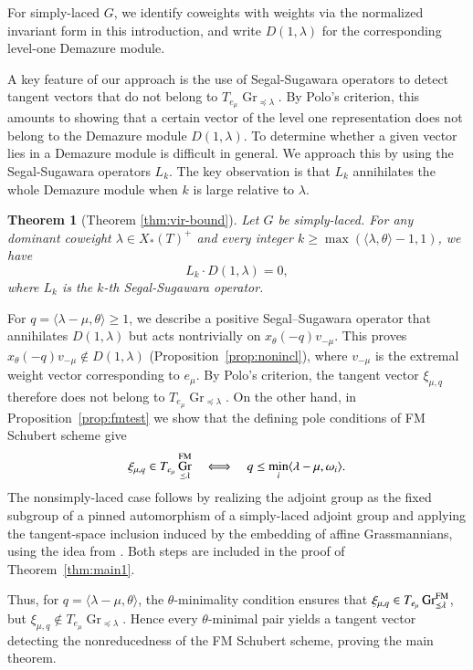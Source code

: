\documentclass[a4paper, 12pt]{amsart}
\newtheorem{introtheorem}[introconjecture]{Theorem}
\theoremstyle{definition}
\DeclareMathOperator{\Gr}{\mathrm{Gr}}
\begin{document}
For simply-laced $G$, we identify coweights with weights via the normalized
invariant form in this introduction, and write $D(1,\lambda)$ for the
corresponding level-one Demazure module.

A key feature of our approach is the use of Segal-Sugawara operators to detect tangent vectors that do not belong to $T_{e_\mu}\Gr_{\preceq \lambda}$.  By Polo's criterion, this amounts to
showing that a certain vector of the level one representation does not belong to the Demazure module $D(1,\lambda)$.  To determine whether a given vector lies in a Demazure module is difficult in
general. We approach this by using the Segal-Sugawara operators $L_k$. The key observation is that $L_k$ annihilates the whole Demazure module when $k$ is large relative to $\lambda$.
\begin{introtheorem}[Theorem \ref{thm:vir-bound}]
Let $G$ be simply-laced. For any dominant coweight $\lambda\in X_*(T)^+$ and  every integer  $k\geq \max ( \langle\lambda,\theta\rangle -1, 1)$,  we have 
\begin{equation}
L_k \cdot D(1,\lambda)=0, 
\end{equation}
where $L_k$ is the $k$-th Segal-Sugawara operator. 
\end{introtheorem}



For $q=\langle\lambda-\mu,\theta\rangle\geq1$, we describe a positive
Segal--Sugawara operator that annihilates $D(1,\lambda)$ but acts
nontrivially on $x_\theta(-q)v_{-\mu}$. This proves
$x_\theta(-q)v_{-\mu}\notin D(1,\lambda)$ (Proposition~\ref{prop:nonincl}), where $v_{-\mu}$ is the extremal
weight vector corresponding to $e_\mu$. By Polo's criterion, the
tangent vector $\xi_{\mu,q}$ therefore does not belong to
$T_{e_\mu}\Gr_{\preceq\lambda}$. On the other hand, in Proposition~\ref{prop:fmtest} we show that the defining pole conditions of FM Schubert scheme give
\[
\xi_{\mu,q}\in T_{e_\mu}\Gr^{\rm FM}_{\preceq\lambda}
\quad\Longleftrightarrow\quad
q\leq\min_i\langle\lambda-\mu,\omega_i\rangle.
\]
The nonsimply-laced case follows by realizing the adjoint group as the
fixed subgroup of a pinned automorphism of a simply-laced adjoint group
and applying the tangent-space inclusion induced by the embedding of
affine Grassmannians, using the idea from \cite{HongMV}. Both steps are included in the proof of
Theorem~\ref{thm:main1}.

 Thus, for $q=\langle\lambda-\mu,\theta\rangle$, the $\theta$-minimality condition ensures that
$\xi_{\mu,q}\in T_{e_\mu}\Gr^{\rm FM}_{\preceq\lambda}$, but
$\xi_{\mu,q}\notin T_{e_\mu}\Gr_{\preceq\lambda}$. Hence every $\theta$-minimal pair yields a tangent vector detecting the nonreducedness of the FM Schubert scheme, proving the main theorem.  
\end{document}
